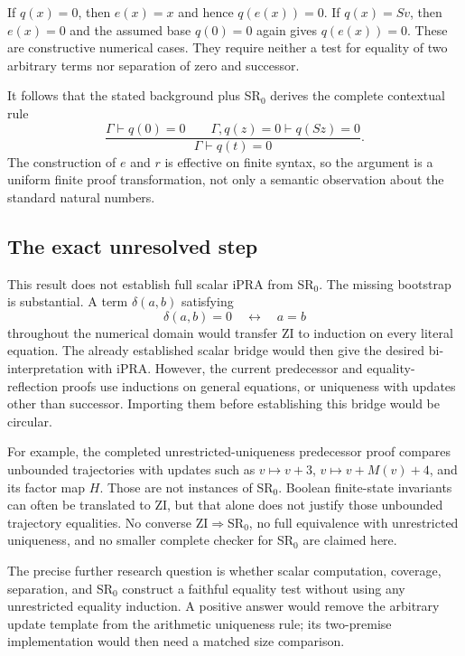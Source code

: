 If $q(x)=0$, then $e(x)=x$ and hence $q(e(x))=0$.  If
$q(x)=Sv$, then $e(x)=0$ and the assumed base $q(0)=0$ again gives
$q(e(x))=0$.  These are constructive numerical cases.  They require
neither a test for equality of two arbitrary terms nor separation of
zero and successor.

It follows that the stated background plus SR$_0$ derives the complete
contextual rule
\[
 \frac{\Gamma\vdash q(0)=0\qquad
       \Gamma,q(z)=0\vdash q(Sz)=0}
      {\Gamma\vdash q(t)=0}.
 \tag{ZI}\label{rule:rigidity-zero-induction}
\]
The construction of $e$ and $r$ is effective on finite syntax, so the
argument is a uniform finite proof transformation, not only a semantic
observation about the standard natural numbers.

\subsection{The exact unresolved step}

This result does not establish full scalar iPRA from SR$_0$.
The missing bootstrap is substantial.  A term $\delta(a,b)$ satisfying
\[
                 \delta(a,b)=0\quad\longleftrightarrow\quad a=b
\]
throughout the numerical domain would transfer ZI to induction on
every literal equation.  The already established scalar bridge would
then give the desired bi-interpretation with iPRA.  However, the current
predecessor and equality-reflection proofs use inductions on general
equations, or uniqueness with updates other than successor.  Importing
them before establishing this bridge would be circular.

For example, the completed unrestricted-uniqueness predecessor proof
compares unbounded trajectories with updates such as $v\mapsto v+3$,
$v\mapsto v+M(v)+4$, and its factor map $H$.  Those are not instances
of SR$_0$.  Boolean finite-state invariants can often be translated to
ZI, but that alone does not justify those unbounded trajectory
equalities.  No converse ZI$\Rightarrow$SR$_0$, no full equivalence with
unrestricted uniqueness, and no smaller complete checker for SR$_0$
are claimed here.

The precise further research question is whether scalar computation,
coverage, separation, and SR$_0$ construct a faithful equality test
without using any unrestricted equality induction.  A positive answer
would remove the arbitrary update template from the arithmetic
uniqueness rule; its two-premise implementation would then need a
matched size comparison.
